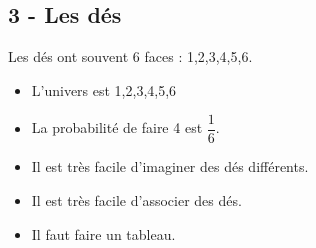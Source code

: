 \subsection*{3 - Les dés}

Les dés ont souvent 6 faces : 1,2,3,4,5,6.

\begin{itemize}[label={$\bullet$}]
  \item L'univers est 1,2,3,4,5,6
  \item La probabilité de faire 4 est $\dfrac{1}{6}$.
  \item Il est très facile d'imaginer des dés différents.
  \item Il est très facile d'associer des dés.
  \item Il faut faire un tableau.
\end{itemize}



